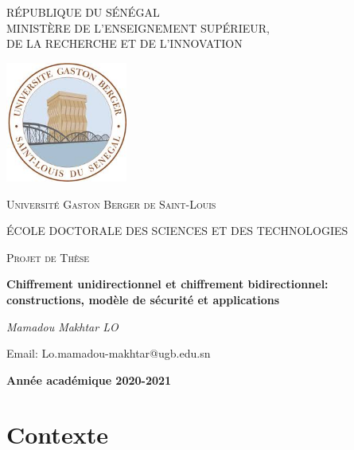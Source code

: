\documentclass[twoside,french,11pt]{amsart}
\date{}
\begin{document}
\begin{titlepage}
	\addtolength{\hoffset}{-1cm}
	\centering
	{\scshape\large RÉPUBLIQUE DU SÉNÉGAL \\MINISTÈRE DE L'ENSEIGNEMENT SUPÉRIEUR,\\
		DE LA RECHERCHE ET DE L'INNOVATION \par}
	\vspace{1cm}
	\includegraphics[width=0.30\textwidth]{logo}\par\vspace{0.2cm}
	{\scshape\Large Université Gaston Berger de Saint-Louis \par}
	\vspace{0.5cm}
	{\scshape\Large ÉCOLE DOCTORALE DES SCIENCES ET DES TECHNOLOGIES \par}
	\vspace{1.5cm}
	{\scshape Projet de Thèse \par}
	
	\vspace{0.5cm}
	
	
	{\LARGE\bfseries \textbf{Chiffrement unidirectionnel et chiffrement bidirectionnel: constructions, modèle de sécurité et applications} \par}
	\vspace{2.5cm}

	{\LARGE\itshape Mamadou Makhtar \textsc{LO} \par}
	{\large Email: Lo.mamadou-makhtar@ugb.edu.sn \par}
	\vfill
	
	{\large \textbf{Année académique 2020-2021}\par}
\end{titlepage}


\newpage

\tableofcontents

\newpage

\section*{Contexte}
\end{document}
